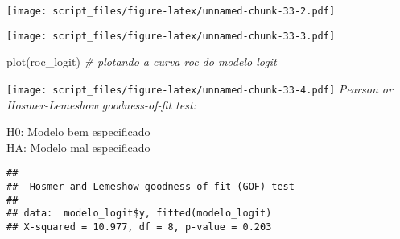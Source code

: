 \documentclass[
]{article}
\newenvironment{Shaded}{\begin{snugshade}}{\end{snugshade}}
\newcommand{\AttributeTok}[1]{\textcolor[rgb]{0.77,0.63,0.00}{#1}}
\newcommand{\CommentTok}[1]{\textcolor[rgb]{0.56,0.35,0.01}{\textit{#1}}}
\newcommand{\DecValTok}[1]{\textcolor[rgb]{0.00,0.00,0.81}{#1}}
\newcommand{\FunctionTok}[1]{\textcolor[rgb]{0.00,0.00,0.00}{#1}}
\newcommand{\NormalTok}[1]{#1}
\newcommand{\OtherTok}[1]{\textcolor[rgb]{0.56,0.35,0.01}{#1}}
\newcommand{\SpecialCharTok}[1]{\textcolor[rgb]{0.00,0.00,0.00}{#1}}
\newcommand{\StringTok}[1]{\textcolor[rgb]{0.31,0.60,0.02}{#1}}
\begin{document}
\texttt{[image: script\_files/figure-latex/unnamed-chunk-33-2.pdf]}

\begin{Shaded}
\end{Shaded}

\texttt{[image: script\_files/figure-latex/unnamed-chunk-33-3.pdf]}

\begin{Shaded}
\begin{Highlighting}[]
\FunctionTok{plot}\NormalTok{(roc\_logit) }\CommentTok{\# plotando a curva roc do modelo logit}
\end{Highlighting}
\end{Shaded}

\texttt{[image: script\_files/figure-latex/unnamed-chunk-33-4.pdf]}
\emph{Pearson or Hosmer-Lemeshow goodness-of-fit test:}

H0: Modelo bem especificado\\
HA: Modelo mal especificado

\begin{Shaded}
\end{Shaded}

\begin{verbatim}
## 
##  Hosmer and Lemeshow goodness of fit (GOF) test
## 
## data:  modelo_logit$y, fitted(modelo_logit)
## X-squared = 10.977, df = 8, p-value = 0.203
\end{verbatim}

\begin{Shaded}
\end{Shaded}
\end{document}
